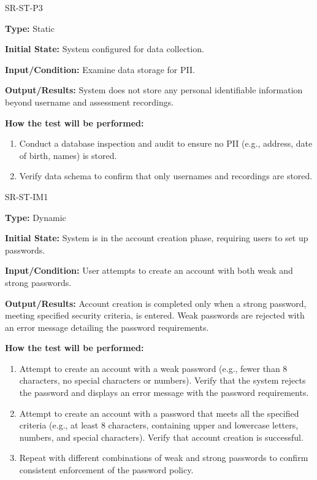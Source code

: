 \documentclass[12pt, titlepage]{article}
\begin{document}
\begin{itemize}
  \begin{item}
    SR-ST-P3
    \begin{mdframed}[linewidth=0.5mm]
      \textbf{Type:} Static \par
      \textbf{Initial State:} System configured for data collection. \par
      \textbf{Input/Condition:} Examine data storage for PII. \par
      \textbf{Output/Results:} System does not store any personal identifiable information beyond username and assessment recordings. \par
      \textbf{How the test will be performed:}
      \begin{enumerate}[noitemsep]
        \item Conduct a database inspection and audit to ensure no PII (e.g., address, date of birth, names) is stored.
        \item Verify data schema to confirm that only usernames and recordings are stored.
      \end{enumerate}
    \end{mdframed}
  \end{item}

  \begin{item}
    SR-ST-IM1
    \begin{mdframed}[linewidth=0.5mm]
      \textbf{Type:} Dynamic \par
      \textbf{Initial State:} System is in the account creation phase, requiring users to set up passwords. \par
      \textbf{Input/Condition:} User attempts to create an account with both weak and strong passwords. \par
      \textbf{Output/Results:} Account creation is completed only when a strong password, meeting specified 
      security criteria, is entered. Weak passwords are rejected with an error message detailing the password requirements. \par
      \textbf{How the test will be performed:}
      \begin{enumerate}[noitemsep]
        \item Attempt to create an account with a weak password (e.g., fewer than 8 characters, no special 
        characters or numbers). Verify that the system rejects the password and displays an error message with the password requirements.
        \item Attempt to create an account with a password that meets all the specified criteria (e.g., at 
        least 8 characters, containing upper and lowercase letters, numbers, and special characters). 
        Verify that account creation is successful.
        \item Repeat with different combinations of weak and strong passwords to confirm consistent 
        enforcement of the password policy.
      \end{enumerate}
    \end{mdframed}
  \end{item}

\end{itemize}
\end{document}
